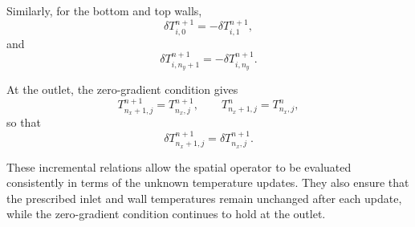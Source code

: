 Similarly, for the bottom and top walls,
\begin{equation}
\boxed{
\delta T_{i,0}^{n+1}
=
-\delta T_{i,1}^{n+1},
}
\label{eq:delta_ghost_bottom}
\end{equation}
and
\begin{equation}
\boxed{
\delta T_{i,n_y+1}^{n+1}
=
-\delta T_{i,n_y}^{n+1}.
}
\label{eq:delta_ghost_top}
\end{equation}

At the outlet, the zero-gradient condition gives
\begin{equation}
T_{n_x+1,j}^{n+1}=T_{n_x,j}^{n+1},
\qquad
T_{n_x+1,j}^{n}=T_{n_x,j}^{n},
\end{equation}
so that
\begin{equation}
\boxed{
\delta T_{n_x+1,j}^{n+1}
=
\delta T_{n_x,j}^{n+1}.
}
\label{eq:delta_ghost_outlet}
\end{equation}

These incremental relations allow the spatial operator to be
evaluated consistently in terms of the unknown temperature updates.
They also ensure that the prescribed inlet and wall temperatures
remain unchanged after each update, while the zero-gradient
condition continues to hold at the outlet.